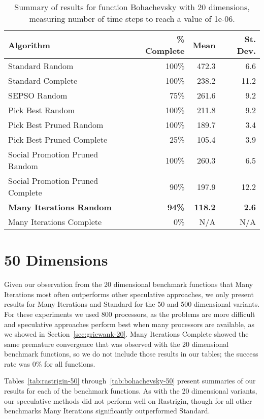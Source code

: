 \documentclass[ms,electronic,twosidetoc,letterpaper,chaptercenter,parttop,equalmargins]{byumsphd}
\renewcommand{\sec}[1]{Section~\ref{sec:#1}}
\begin{document}
\begin{table}
  \caption{Summary of results for function Bohachevsky with 20 dimensions,
  measuring number of time steps to reach a value of 1e-06.}
  \label{tab:bohachevsky-20}
  \centering
  \begin{tabular}{|l|r|r|r|}
  \hline
  Algorithm&\% Complete&Mean&St. Dev.\\
  \hline
  \hline
  Standard Random&100\%&472.3&6.6\\
  \hline
  Standard Complete&100\%&238.2&11.2\\
  \hline
  SEPSO Random&75\%&261.6&9.2\\
  \hline
  Pick Best Random&100\%&211.8&9.2\\
  \hline
  Pick Best Pruned Random&100\%&189.7&3.4\\
  \hline
  Pick Best Pruned Complete&25\%&105.4&3.9\\
  \hline
  Social Promotion Pruned Random&100\%&260.3&6.5\\
  \hline
  Social Promotion Pruned Complete&90\%&197.9&12.2\\
  \hline
  \textbf{Many Iterations Random}&\textbf{94\%}&\textbf{118.2}&\textbf{2.6}\\
  \hline
  Many Iterations Complete&0\%&N/A&N/A\\
  \hline
  \end{tabular}
\end{table}


\section{50 Dimensions}
\label{sec:50dims}

Given our observation from the 20 dimensional benchmark functions that Many
Iterations most often outperforms other speculative approaches, we only present
results for Many Iterations and Standard for the 50 and 500 dimensional
variants.  For these experiments we used 800 processors, as the problems are
more difficult and speculative approaches perform best when many processors are
available, as we showed in \sec{griewank-20}.  Many Iterations Complete showed
the same premature convergence that was observed with the 20 dimensional
benchmark functions, so we do not include those results in our tables; the
success rate was 0\% for all functions.

Tables~\ref{tab:rastrigin-50} through~\ref{tab:bohachevsky-50} present
summaries of our results for each of the benchmark functions. As with the 20
dimensional variants, our speculative methods did not perform well on
Rastrigin, though for all other benchmarks Many Iterations significantly
outperformed Standard.
\end{document}
